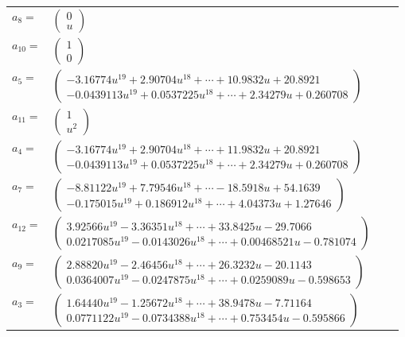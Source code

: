 \documentclass[1p]{elsarticle_modified}
\theoremstyle{definition}
\begin{document}
\begin{tabular}{m{7pt} m{180pt} m{7pt} m{180pt} }
\flushright $a_{8}=$&$\begin{pmatrix}0\\u\end{pmatrix}$ \\
\flushright $a_{10}=$&$\begin{pmatrix}1\\0\end{pmatrix}$ \\
\flushright $a_{5}=$&$\begin{pmatrix}-3.16774 u^{19}+2.90704 u^{18}+\cdots+10.9832 u+20.8921\\-0.0439113 u^{19}+0.0537225 u^{18}+\cdots+2.34279 u+0.260708\end{pmatrix}$ \\
\flushright $a_{11}=$&$\begin{pmatrix}1\\u^2\end{pmatrix}$ \\
\flushright $a_{4}=$&$\begin{pmatrix}-3.16774 u^{19}+2.90704 u^{18}+\cdots+11.9832 u+20.8921\\-0.0439113 u^{19}+0.0537225 u^{18}+\cdots+2.34279 u+0.260708\end{pmatrix}$ \\
\flushright $a_{7}=$&$\begin{pmatrix}-8.81122 u^{19}+7.79546 u^{18}+\cdots-18.5918 u+54.1639\\-0.175015 u^{19}+0.186912 u^{18}+\cdots+4.04373 u+1.27646\end{pmatrix}$ \\
\flushright $a_{12}=$&$\begin{pmatrix}3.92566 u^{19}-3.36351 u^{18}+\cdots+33.8425 u-29.7066\\0.0217085 u^{19}-0.0143026 u^{18}+\cdots+0.00468521 u-0.781074\end{pmatrix}$ \\
\flushright $a_{9}=$&$\begin{pmatrix}2.88820 u^{19}-2.46456 u^{18}+\cdots+26.3232 u-20.1143\\0.0364007 u^{19}-0.0247875 u^{18}+\cdots+0.0259089 u-0.598653\end{pmatrix}$ \\
\flushright $a_{3}=$&$\begin{pmatrix}1.64440 u^{19}-1.25672 u^{18}+\cdots+38.9478 u-7.71164\\0.0771122 u^{19}-0.0734388 u^{18}+\cdots+0.753454 u-0.595866\end{pmatrix}$ \\

\end{tabular}
\end{document}
